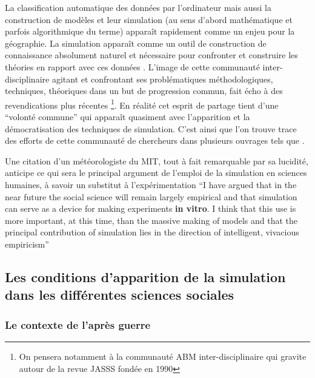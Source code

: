 La classification automatique des données par l'ordinateur mais aussi la construction de modèles et leur simulation (au sens d'abord mathématique et parfois algorithmique du terme) apparaît rapidement comme un enjeu pour la géographie. La simulation apparaît comme un outil de construction de connaissance absolument naturel et nécessaire pour confronter et construire les théories en rapport avec ces données \autocite{Kao1963, Hagerstrand1967b}. L'image de cette communauté inter-disciplinaire agitant et confrontant ses problématiques méthodologiques, techniques, théoriques dans un but de progression commun, fait écho à des revendications plus récentes \footnote{On pensera notamment à la communauté ABM inter-disciplinaire qui gravite autour de la revue JASSS fondée en  1990}. En réalité cet esprit de partage tient d'une \enquote{volonté commune} qui apparaît quasiment avec l'apparition et la démocratisation des techniques de simulation. C'est ainsi que l'on trouve trace des efforts de cette communauté de chercheurs dans plusieurs ouvrages tels que \autocite{Beshers1965,Naylor1966,Dutton1971,Guetzkow1962,Guetzkow1972}.

Une citation d'un météorologiste du MIT, tout à fait remarquable par sa lucidité, anticipe ce qui sera le principal argument de l'emploi de la simulation en sciences humaines, à savoir un substitut à l'expérimentation \foreignquote{english}{I have argued that in the near future the social science will remain largely empirical and that simulation can serve as a device for making experiments \textbf{in vitro}. I think that this use is more important, at this time, than the massive making of models and that the principal contribution of simulation lies in the direction of intelligent, vivacious empiricism} \autocite{Fleisher1965}


\subsection{Les conditions d'apparition de la simulation dans les différentes sciences sociales }
\label{sec:apparition_simu_science_sociales}

\subsubsection{Le contexte de l'après guerre}
\label{ssec:contexte_apres_guerre}

